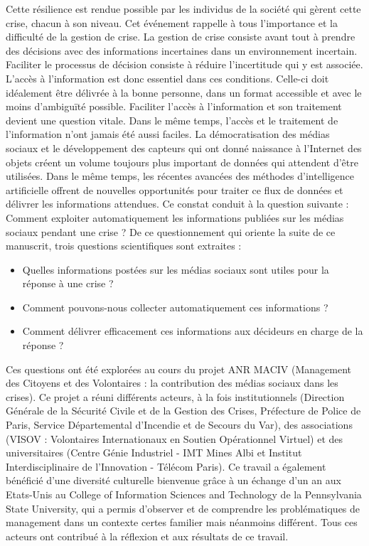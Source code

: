 Cette résilience est rendue possible par les individus de la société qui gèrent cette crise, chacun à son niveau.
Cet événement rappelle à tous l'importance et la difficulté de la gestion de crise.
La gestion de crise consiste avant tout à prendre des décisions avec des informations incertaines dans un environnement incertain.
Faciliter le processus de décision consiste à réduire l'incertitude qui y est associée. L'accès à l'information est donc essentiel dans ces conditions.
Celle-ci doit idéalement être délivrée à la bonne personne, dans un format accessible et avec le moins d'ambiguïté possible.
Faciliter l'accès à l'information et son traitement devient une question vitale.
Dans le même temps, l'accès et le traitement de l'information n'ont jamais été aussi faciles.
La démocratisation des médias sociaux et le développement des capteurs qui ont donné naissance à l'Internet des objets créent un volume toujours plus important de données qui attendent d'être utilisées.
Dans le même temps, les récentes avancées des méthodes d'intelligence artificielle offrent de nouvelles opportunités pour traiter ce flux de données et délivrer les informations attendues.
Ce constat conduit à la question suivante : Comment exploiter automatiquement les informations publiées sur les médias sociaux pendant une crise ?
De ce questionnement qui oriente la suite de ce manuscrit, trois questions scientifiques sont extraites :
\begin{itemize}
    \item Quelles informations postées sur les médias sociaux sont utiles pour la réponse à une crise ?
    \item Comment pouvons-nous collecter automatiquement ces informations ?
    \item Comment délivrer efficacement ces informations aux décideurs en charge de la réponse ?
\end{itemize}
Ces questions ont été explorées au cours du projet ANR MACIV (Management des Citoyens et des Volontaires : la contribution des médias sociaux dans les crises).
Ce projet a réuni différents acteurs, à la fois institutionnels (Direction Générale de la Sécurité Civile et de la Gestion des Crises, Préfecture de Police de Paris, Service Départemental d'Incendie et de Secours du Var), des associations (VISOV : Volontaires Internationaux en Soutien Opérationnel Virtuel) et des universitaires (Centre Génie Industriel - IMT Mines Albi et Institut Interdisciplinaire de l'Innovation - Télécom Paris).
Ce travail a également bénéficié d'une diversité culturelle bienvenue grâce à un échange d'un an aux Etats-Unis au College of Information Sciences and Technology de la Pennsylvania State University, qui a permis d'observer et de comprendre les problématiques de management dans un contexte certes familier mais néanmoins différent.
Tous ces acteurs ont contribué à la réflexion et aux résultats de ce travail.

